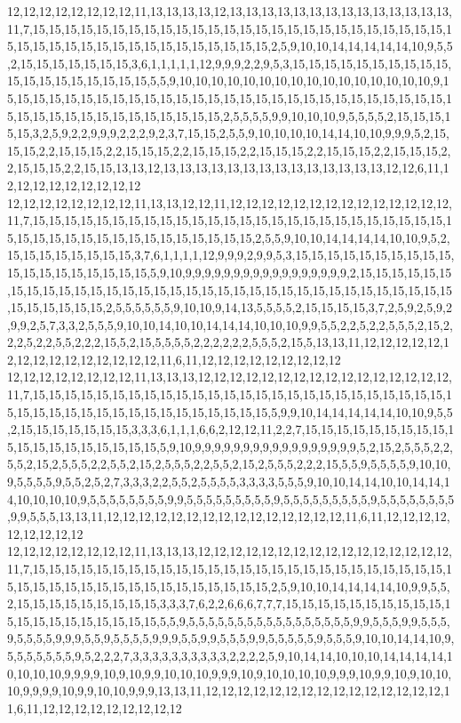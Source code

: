 12,12,12,12,12,12,12,12,11,13,13,13,13,12,13,13,13,13,13,13,13,13,13,13,13,13,13,13,11,7,15,15,15,15,15,15,15,15,15,15,15,15,15,15,15,15,15,15,15,15,15,15,15,15,15,15,15,15,15,15,15,15,15,15,15,15,15,15,15,15,15,15,15,2,5,9,10,10,14,14,14,14,14,10,9,5,5,2,15,15,15,15,15,15,15,3,6,1,1,1,1,1,12,9,9,9,2,2,9,5,3,15,15,15,15,15,15,15,15,15,15,15,15,15,15,15,15,15,15,15,5,5,9,10,10,10,10,10,10,10,10,10,10,10,10,10,10,10,10,9,15,15,15,15,15,15,15,15,15,15,15,15,15,15,15,15,15,15,15,15,15,15,15,15,15,15,15,15,15,15,15,15,15,15,15,15,15,15,15,15,15,15,2,5,5,5,5,9,9,10,10,10,9,5,5,5,5,2,15,15,15,15,15,3,2,5,9,2,2,9,9,9,2,2,2,9,2,3,7,15,15,2,5,5,9,10,10,10,10,14,14,10,10,9,9,9,5,2,15,15,15,2,2,15,15,15,2,2,15,15,15,2,2,15,15,15,2,2,15,15,15,2,2,15,15,15,2,2,15,15,15,2,2,15,15,15,2,2,15,15,13,13,12,13,13,13,13,13,13,13,13,13,13,13,13,13,13,12,12,6,11,12,12,12,12,12,12,12,12,12
12,12,12,12,12,12,12,12,11,13,13,12,12,11,12,12,12,12,12,12,12,12,12,12,12,12,12,12,11,7,15,15,15,15,15,15,15,15,15,15,15,15,15,15,15,15,15,15,15,15,15,15,15,15,15,15,15,15,15,15,15,15,15,15,15,15,15,15,15,15,15,15,2,5,5,9,10,10,14,14,14,14,10,10,9,5,2,15,15,15,15,15,15,15,15,3,7,6,1,1,1,1,12,9,9,9,2,9,9,5,3,15,15,15,15,15,15,15,15,15,15,15,15,15,15,15,15,15,15,15,5,9,10,9,9,9,9,9,9,9,9,9,9,9,9,9,9,9,9,9,2,15,15,15,15,15,15,15,15,15,15,15,15,15,15,15,15,15,15,15,15,15,15,15,15,15,15,15,15,15,15,15,15,15,15,15,15,15,15,15,15,2,5,5,5,5,5,5,9,10,10,9,14,13,5,5,5,5,2,15,15,15,15,3,7,2,5,9,2,5,9,2,9,9,2,5,7,3,3,2,5,5,5,9,10,10,14,10,10,14,14,14,10,10,10,9,9,5,5,2,2,5,2,2,5,5,5,2,15,2,2,2,5,2,2,5,5,2,2,2,15,5,2,15,5,5,5,5,2,2,2,2,2,2,5,5,5,2,15,5,13,13,11,12,12,12,12,12,12,12,12,12,12,12,12,12,12,12,11,6,11,12,12,12,12,12,12,12,12,12
12,12,12,12,12,12,12,12,11,13,13,13,12,12,12,12,12,12,12,12,12,12,12,12,12,12,12,12,11,7,15,15,15,15,15,15,15,15,15,15,15,15,15,15,15,15,15,15,15,15,15,15,15,15,15,15,15,15,15,15,15,15,15,15,15,15,15,15,15,15,15,15,15,5,9,9,10,14,14,14,14,14,10,10,9,5,5,2,15,15,15,15,15,15,15,3,3,3,6,1,1,1,6,6,2,12,12,11,2,2,7,15,15,15,15,15,15,15,15,15,15,15,15,15,15,15,15,15,15,15,5,9,10,9,9,9,9,9,9,9,9,9,9,9,9,9,9,9,9,9,5,2,15,2,5,5,5,2,2,5,5,2,15,2,5,5,5,2,2,5,5,2,15,2,5,5,5,2,2,5,5,2,15,2,5,5,5,2,2,2,15,5,5,9,5,5,5,5,9,10,10,9,5,5,5,5,9,5,5,2,5,2,7,3,3,3,2,2,5,5,2,5,5,5,5,3,3,3,3,5,5,5,9,10,10,14,14,10,10,14,14,14,10,10,10,10,9,5,5,5,5,5,5,5,5,9,9,5,5,5,5,5,5,5,5,5,9,5,5,5,5,5,5,5,5,5,9,5,5,5,5,5,5,5,5,9,9,5,5,5,13,13,11,12,12,12,12,12,12,12,12,12,12,12,12,12,12,12,11,6,11,12,12,12,12,12,12,12,12,12
12,12,12,12,12,12,12,12,11,13,13,13,12,12,12,12,12,12,12,12,12,12,12,12,12,12,12,12,11,7,15,15,15,15,15,15,15,15,15,15,15,15,15,15,15,15,15,15,15,15,15,15,15,15,15,15,15,15,15,15,15,15,15,15,15,15,15,15,15,15,15,15,15,2,5,9,10,10,14,14,14,14,10,9,9,5,5,2,15,15,15,15,15,15,15,15,15,3,3,3,7,6,2,2,6,6,6,7,7,7,15,15,15,15,15,15,15,15,15,15,15,15,15,15,15,15,15,15,15,15,5,5,9,5,5,5,5,5,5,5,5,5,5,5,5,5,5,5,5,5,9,9,5,5,5,9,9,5,5,5,9,5,5,5,5,9,9,9,5,5,9,5,5,5,5,9,9,9,5,5,9,9,5,5,5,9,9,5,5,5,5,5,9,5,5,5,9,10,10,14,14,10,9,5,5,5,5,5,5,5,9,5,2,2,2,7,3,3,3,3,3,3,3,3,3,3,2,2,2,2,5,9,10,14,14,10,10,10,14,14,14,14,10,10,10,10,9,9,9,9,10,9,10,9,9,10,10,10,9,9,9,10,9,10,10,10,10,9,9,9,10,9,9,10,9,10,10,10,9,9,9,9,10,9,9,10,10,9,9,9,13,13,11,12,12,12,12,12,12,12,12,12,12,12,12,12,12,12,11,6,11,12,12,12,12,12,12,12,12,12
